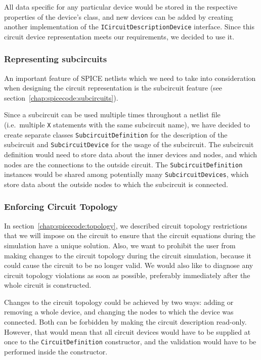 All data specific for any particular device would be stored in the respective properties of the device's class, and new devices can be added by creating another implementation of the \texttt{ICircuitDescriptionDevice} interface. Since this circuit device representation meets our requirements, we decided to use it.

\subsubsection{Representing subcircuits}
An important feature of SPICE netlists which we need to take into consideration when designing the circuit representation is the subcircuit feature (see section~\ref{chap:spicecode:subcircuits}).

Since a subcircuit can be used multiple times throughout a netlist file (i.e.\ multiple \texttt{X} statements with the same subcircuit name), we have decided to create separate classes \texttt{SubcircuitDefinition} for the description of the subcircuit  and \texttt{SubcircuitDevice} for the usage of the subcircuit. The subcircuit definition would need to store data about the inner devices and nodes, and which nodes are the connections to the outside circuit. The \texttt{SubcircuitDefinition} instances would be shared among potentially many \texttt{SubcircuitDevices}, which store data about the outside nodes to which the subcircuit is connected. 


\subsubsection{Enforcing Circuit Topology}
In section~\ref{chap:spicecode:topology}, we described circuit topology restrictions that we will impose on the circuit to ensure that the circuit equations during the simulation have a unique solution. Also, we want to prohibit the user from making changes to the circuit topology during the circuit simulation, because it could cause the circuit to be no longer valid. We would also like to diagnose any circuit topology violations as soon as possible, preferably immediately after the whole circuit is constructed.

Changes to the circuit topology could be achieved by two ways: adding or removing a whole device, and changing the nodes to which the device was connected. Both can be forbidden by making the circuit description read-only. However, that would mean that all circuit devices would have to be supplied at once to the \texttt{CircuitDefinition} constructor, and the validation would have to be performed inside the constructor.

